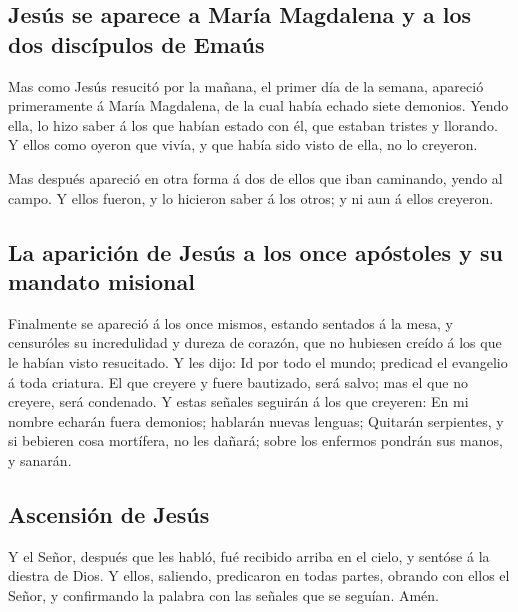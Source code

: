 \hypertarget{jesuxfas-se-aparece-a-maruxeda-magdalena-y-a-los-dos-discuxedpulos-de-emauxfas}{%
\subsection{Jesús se aparece a María Magdalena y a los dos discípulos de
Emaús}\label{jesuxfas-se-aparece-a-maruxeda-magdalena-y-a-los-dos-discuxedpulos-de-emauxfas}}

 Mas como Jesús resucitó por la mañana, el primer día de
la semana, apareció primeramente á María Magdalena, de la cual había
echado siete demonios.  Yendo ella, lo hizo saber á los
que habían estado con él, que estaban tristes y llorando.
 Y ellos como oyeron que vivía, y que había sido visto de
ella, no lo creyeron.

 Mas después apareció en otra forma á dos de ellos que
iban caminando, yendo al campo.  Y ellos fueron, y lo
hicieron saber á los otros; y ni aun á ellos creyeron.

\hypertarget{la-apariciuxf3n-de-jesuxfas-a-los-once-apuxf3stoles-y-su-mandato-misional}{%
\subsection{La aparición de Jesús a los once apóstoles y su mandato
misional}\label{la-apariciuxf3n-de-jesuxfas-a-los-once-apuxf3stoles-y-su-mandato-misional}}

 Finalmente se apareció á los once mismos, estando
sentados á la mesa, y censuróles su incredulidad y dureza de corazón,
que no hubiesen creído á los que le habían visto resucitado.
 Y les dijo: Id por todo el mundo; predicad el evangelio
á toda criatura.  El que creyere y fuere bautizado, será
salvo; mas el que no creyere, será condenado.  Y estas
señales seguirán á los que creyeren: En mi nombre echarán fuera
demonios; hablarán nuevas lenguas;  Quitarán serpientes,
y si bebieren cosa mortífera, no les dañará; sobre los enfermos pondrán
sus manos, y sanarán.

\hypertarget{ascensiuxf3n-de-jesuxfas}{%
\subsection{Ascensión de Jesús}\label{ascensiuxf3n-de-jesuxfas}}

 Y el Señor, después que les habló, fué recibido arriba
en el cielo, y sentóse á la diestra de Dios.  Y ellos,
saliendo, predicaron en todas partes, obrando con ellos el Señor, y
confirmando la palabra con las señales que se seguían. Amén.
